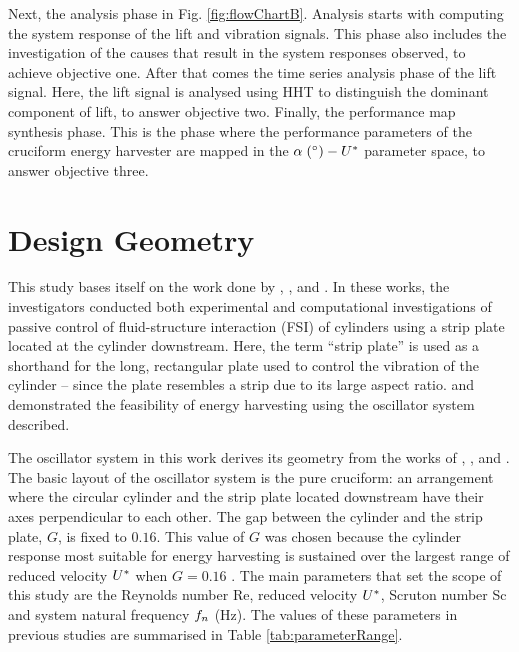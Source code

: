 \documentclass[oneside]{utmthesis}
\begin{document}
 Next, the analysis phase in Fig. \ref{fig:flowChartB}. Analysis starts with computing the system response of the lift and vibration signals. This phase also includes the investigation of the causes that result in the system responses observed, to achieve objective one. After that comes the time series analysis phase of the lift signal. Here, the lift signal is analysed using HHT to distinguish the dominant component of lift, to answer objective two. Finally, the performance map synthesis phase. This is the phase where the performance parameters of the cruciform energy harvester are mapped in the $\alpha \; (\si{\degree}) - \ured$ parameter space, to answer objective three.

\section{Design Geometry} \label{sec:probGeo}

\vspace{\baselineskip}

This study bases itself on the work done by \citet{Koide2013}, \citet{Maruai2017}, and \citet{Maruai2018}. In these works, the investigators conducted both experimental and computational investigations of passive control of fluid-structure interaction (FSI) of cylinders using a strip plate located at the cylinder downstream. Here, the term ``strip plate'' is used as a shorthand for the long, rectangular plate used to control the vibration of the cylinder -- since the plate resembles a strip due to its large aspect ratio. \citet{Koide2013} and \citet{Maruai2018} demonstrated the feasibility of energy harvesting using the oscillator system described.


The oscillator system in this work derives its geometry from the works of \citet{Nguyen2012}, \citet{Koide2013}, and \citet{Koide2017}. The basic layout of the oscillator system is the pure cruciform: an arrangement where the circular cylinder and the strip plate located downstream have their axes perpendicular to each other. The gap between the cylinder and the strip plate, $G$, is fixed to $0.16$. This value of $G$ was chosen because the cylinder response most suitable for energy harvesting is sustained over the largest range of reduced velocity $U^{*}$ when $G = 0.16$ \citep{Koide2013}. The main parameters that set the scope of this study are the Reynolds number Re, reduced velocity $U^{*}$, Scruton number Sc and system natural frequency $f_{n}$ (Hz). The values of these parameters in previous studies are summarised in Table \ref{tab:parameterRange}.
\end{document}
